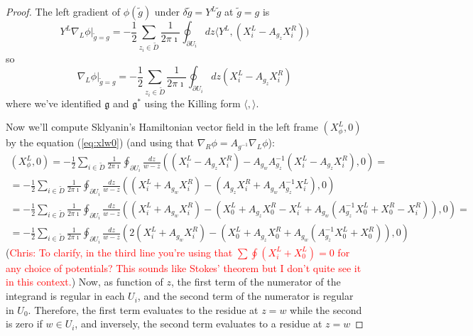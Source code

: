 \documentclass[11pt, oneside, reqno]{amsart}
\theoremstyle{definition} \newtheorem{definition}{Definition}[section]
\theoremstyle{definition} \newtheorem{remark}[definition]{Remark}
\theoremstyle{definition} \newtheorem{remarks}[definition]{Remarks}
\theoremstyle{definition} \newtheorem{question}[definition]{Question}
\theoremstyle{definition} \newtheorem*{note}{Note}
\theoremstyle{definition} \newtheorem{example}[definition]{Example}
\theoremstyle{definition} \newtheorem{examples}[definition]{Examples}
\renewcommand{\gg}{\mathfrak{g}}
\newcommand{\chris}[1]{(\textcolor{red}{Chris: #1})}
\begin{document}
\begin{proof}
The left gradient of $\phi(\tilde g)$ under $ \delta \tilde g = Y^{L} \tilde g$ at $\tilde g = g$ is
\begin{equation}
  Y^{L} \nabla_{L} \phi|_{\tilde g = g}  = - \frac 1 2  \sum_{z_i \in \tilde D} \frac{1}{2 \pi \imath } \oint_{\partial U_{i}}  dz
 \langle  Y^{L} , (X^{L}_i - A_{g_z} X_i^R) ) 
\end{equation}
so 
\begin{equation}
  \nabla_{L} \phi|_{\tilde g = g}  = -\frac 1 2  \sum_{z_i \in \tilde D} \frac{1}{2 \pi \imath } \oint_{\partial U_{i}}  dz
 (X^{L}_i - A_{g_z} X_i^R) 
\end{equation}
where we've identified $\gg$ and $\gg^{*}$ using the Killing form $\langle , \rangle$. 

Now we'll compute Sklyanin's Hamiltonian vector field in the left frame
$(X_{\phi}^{L}, 0)$ by the equation (\ref{eq:xlw0}) (and using that $\nabla_{R} \phi  =
A_{g^{-1}} \nabla_{L} \phi$):
\begin{multline}
  (X^{L}_\phi, 0) = -\frac 1 2 \sum_{i \in \tilde D} \frac{1}{2 \pi \imath} \oint_{\partial U_i}
  \frac{dz}{w - z} ( (X_i^{L} - A_{g_z} X_i^{R})  - A_{g_w} A_{g_z}^{-1} (X_i^{L} - A_{g_z} X_i^{R}),0) =\\
=  -\frac 1 2 \sum_{i \in \tilde D} \frac{1}{2 \pi \imath} \oint_{\partial U_i}
\frac{dz}{w - z} ( (X_i^{L}  + A_{g_w} X_i^{R}) - (A_{g_z} X_i^{R} +  A_{g_{w}} A_{g_{z}}^{-1} X_i^{L}),0) \\
 = -\frac 1 2  \sum_{i \in \tilde D} \frac{1}{2 \pi \imath} \oint_{\partial U_i}
 \frac{dz}{w - z} ( (X_i^{L}  + A_{g_w} X_i^{R}) - (X_0^{L} + A_{g_z} X_0^{R}- X_{i}^{L} +  A_{g_{w}} ( A_{g_{z}}^{-1} X_0^{L} + X_0^{R} - X_{i}^{R})),0)= \\
  = -\frac 1 2  \sum_{i \in \tilde D} \frac{1}{2 \pi \imath} \oint_{\partial U_i}
    \frac{dz}{w - z} ( 2 (X_i^{L}  + A_{g_w} X_i^{R}) - (X_0^{L} + A_{g_z} X_0^{R} +  A_{g_{w}} ( A_{g_{z}}^{-1} X_0^{L} + X_0^{R} )),0)
  \end{multline}
  \chris{To clarify, in the third line you're using that $\sum \oint (X^L_i + X^L_0) = 0$ for any choice of potentials?  This sounds like Stokes' theorem but I don't quite see it in this context.}
  Now, as function of $z$, the first term of the numerator of the integrand is regular in each $U_i$, and the second term of the numerator is regular in $U_0$. Therefore,
  the first term  evaluates to the residue at $z = w$ while the second is zero if $w \in U_i$,
  and inversely,  the second term evaluates to a residue at $z = w$

\end{proof}
\end{document}
